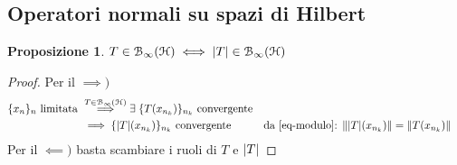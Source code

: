 \documentclass[a4paper,10pt]{article}
\theoremstyle{definition}
\newcommand{\hil}{\mathcal{H}} %
\theoremstyle{indentdefinition}
\theoremstyle{indenttheorem}
\newtheorem{prop}{Proposizione}
\theoremstyle{myremark}
\theoremstyle{indentgeneral}
\newenvironment{myboxed} 
{\noindent\begin{lrbox}{\mybox}\begin{minipage}{\textwidth}}
{\end{minipage}\end{lrbox}\fbox{\usebox{\mybox}}}
\begin{document}
\subsection{Operatori normali su spazi di Hilbert}
\begin{myboxed}
    \begin{prop}
        $T\in\mathcal{B}_\infty(\hil)\iff\abs{T}\in\mathcal{B}_\infty(\hil)$
    \end{prop}
\end{myboxed}
\begin{proof} Per il $\implies)$
    \begin{align*}
        \{x_n\}_n \text{ limitata } &\overset{T\in\mathcal{B}_\infty(\hil)}{\implies} \exists\; 
        \{T(x_{n_k})\}_{n_k} \text{ convergente} \\
        &\implies \{\abs{T}(x_{n_k})\}_{n_k} \text{ convergente} && \text{da \ref{eq-modulo}: } \norm{\abs{T}(x_{n_k})}=\norm{T(x_{n_k})}
    \end{align*}
    Per il $\impliedby)$ basta scambiare i ruoli di $T$ e $\abs{T}$
\end{proof}
\end{document}
